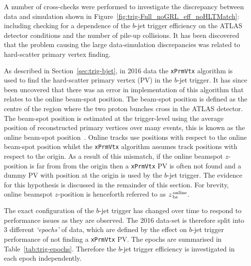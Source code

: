 \newpage

A number of cross-checks were performed to investigate the discrepancy between data and simulation shown in Figure~\ref{fig:trig-Full_noGRL_eff_noHLTMatch}:
including checking for a dependence of the $b$-jet trigger efficiency on the ATLAS detector conditions and the number of pile-up collisions.
It has been discovered that the problem causing the large data-simulation discrepancies was related to hard-scatter primary vertex finding.

As described in Section~\ref{sec:trig-bjet}, in 2016 data the \verb|xPrmVtx| algorithm is used to find the hard-scatter primary vertex (PV) in the $b$-jet trigger.
It has since been uncovered that there was an error in implementation of this algorithm that relates to the online beam-spot position.
The beam-spot position is defined as the centre of the region where the two proton bunches cross in the ATLAS detector.
The beam-spot position is estimated at the trigger-level using the average position of reconstructed primary vertices over many events,
this is known as the online beam-spot position~\cite{trig-onlinePV}.
Online tracks use positions with respect to the online beam-spot position
whilst the \verb|xPrmVtx| algorithm assumes track positions with respect to the origin.
As a result of this mismatch, if the online beamspot $z$-position is far from from the origin then
a \verb|xPrmVtx| PV is often not found and a dummy PV with position at the origin is used by the $b$-jet trigger.
The evidence for this hypothesis is discussed in the remainder of this section.
For brevity, online beamspot $z$-position is henceforth referred to as $z_{\,\text{bs}}^{\text{\,online}}$.  

The exact configuration of the $b$-jet trigger has changed over time to respond to performance issues as they are observed.
The 2016 data-set is therefore split into 3 different \textit{`epochs'} of data, which are defined by the effect on $b$-jet trigger performance of not finding a \verb|xPrmVtx| PV.
The epochs are summarised in Table~\ref{tab:trig-epochs}.
Therefore the $b$-jet trigger efficiency is investigated in each epoch independently.

